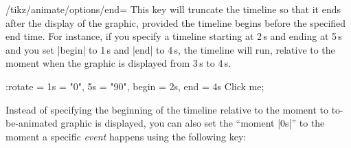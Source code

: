 \begin{key}{/tikz/animate/options/end=}
    This key will truncate the timeline so that it ends  after the
    display of the graphic, provided the timeline begins before the specified
    end time. For instance, if you specify a timeline starting at 2\,s and
    ending at 5\,s and you set |begin| to 1\,s and |end| to 4\,s, the timeline
    will run, relative to the moment when the graphic is displayed from 3\,s to
    4\,s.
\begin{codeexample}[preamble={\usetikzlibrary{animations}}]
\tikz \node [fill = green!50!black, text = white]
    :rotate = { 1s = "0", 5s = "90", begin = 2s, end = 4s }
  {Click me};
\end{codeexample}
\end{key}

Instead of specifying the beginning of the timeline relative to the moment to
to-be-animated graphic is displayed, you can also set the ``moment |0s|'' to
the moment a specific \emph{event} happens using the following key:

